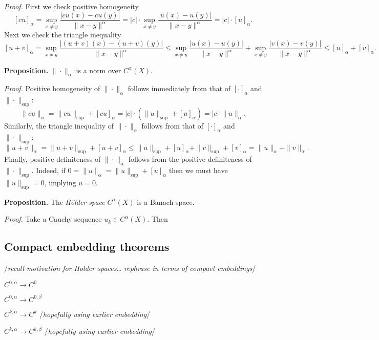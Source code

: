 \documentclass[
]{article}
\begin{document}
\emph{Proof.} First we check positive homogeneity \[
    [cu]_{\alpha} 
    = \sup_{x \neq y}\frac{|cu(x) - cu(y)|}{\|x-y\|^{\alpha}}
    = |c|\cdot\sup_{x \neq y}\frac{|u(x) - u(y)|}{\|x-y\|^{\alpha}}
    = |c|\cdot[u]_{\alpha}.
\] Next we check the triangle inequality \[
    [u+v]_{\alpha}
    = \sup_{x \neq y}\frac{|(u+v)(x) - (u+v)(y)|}{\|x-y\|^{\alpha}}
    \leq \sup_{x \neq y}\frac{|u(x) - u(y)|}{\|x-y\|^{\alpha}}
    + \sup_{x \neq y}\frac{|v(x) - v(y)|}{\|x-y\|^{\alpha}}
    \leq [u]_{\alpha} + [v]_{\alpha}.
\]

\textbf{Proposition.} \(\|\cdot\|_{\alpha}\) is a norm over
\(C^{\alpha}(X)\).

\emph{Proof.} Positive homogeneity of \(\|\cdot\|_{\alpha}\) follows
immediately from that of \([\cdot]_{\alpha}\) and \(\|\cdot\|_{\sup}\):
\[
    \|cu\|_{\alpha} 
    = \|cu\|_{\sup} + [cu]_{\alpha}
    = |c| \cdot (\|u\|_{\sup} + [u]_{\alpha})
    = |c|\cdot\|u\|_{\alpha}.
\] Similarly, the triangle inequality of \(\|\cdot\|_{\alpha}\) follows
from that of \([\cdot]_{\alpha}\) and \(\|\cdot\|_{\sup}\): \[
    \|u+v\|_{\alpha} 
    = \|u+v\|_{\sup} + [u+v]_{\alpha}
    \leq  \|u\|_{\sup} + [u]_{\alpha} + \|v\|_{\sup} + [v]_{\alpha}
    = \|u\|_{\alpha} + \|v\|_{\alpha}.
\] Finally, positive definiteness of \(\|\cdot\|_{\alpha}\) follows from
the positive definiteness of \(\|\cdot\|_{\sup}\). Indeed, if
\(0 = \|u\|_{\alpha} = \|u\|_{\sup} + [u]_{\alpha}\) then we must have
\(\|u\|_{\sup} = 0\), implying \(u = 0\).

\textbf{Proposition.} The \emph{Hölder space} \(C^{\alpha}(X)\) is a
Banach space.

\emph{Proof.} Take a Cauchy sequence \(u_k \in C^{\alpha}(X)\). Then

\hypertarget{compact-embedding-theorems}{%
\subsection{Compact embedding
theorems}\label{compact-embedding-theorems}}

/\emph{recall motivation for Holder spaces\ldots{} rephrase in terms of
compact embeddings}/

\(C^{0, \alpha} \to C^0\)

\(C^{0, \alpha} \to C^{0, \beta}\)

\(C^{k, \alpha} \to C^{k}\) /\emph{hopefully using earlier embedding}/

\(C^{k, \alpha} \to C^{k, \beta}\) /\emph{hopefully using earlier
embedding}/
\end{document}

